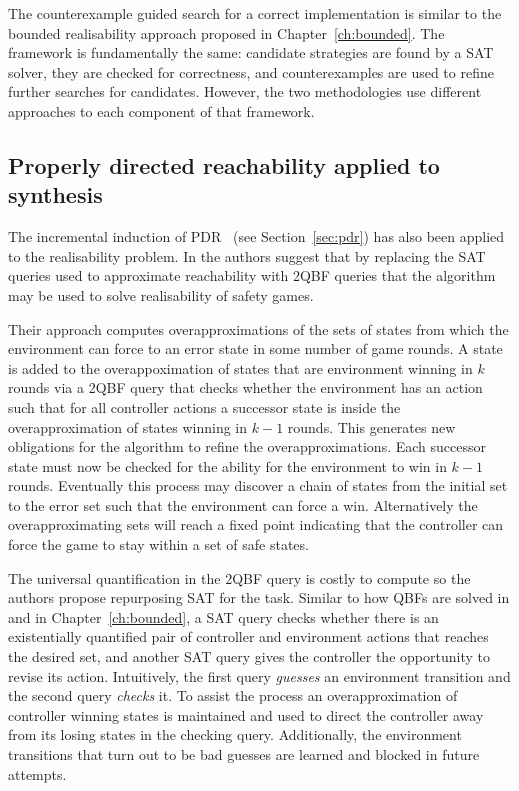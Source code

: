 The counterexample guided search for a correct implementation is similar to the bounded realisability approach proposed in Chapter~\ref{ch:bounded}. The framework is fundamentally the same: candidate strategies are found by a SAT solver, they are checked for correctness, and counterexamples are used to refine further searches for candidates. However, the two methodologies use different approaches to each component of that framework.

\subsection{Properly directed reachability applied to synthesis}

The incremental induction of PDR~\cite{Bradley11} (see Section~\ref{sec:pdr}) has also been applied to the realisability problem. In \cite{Morgenstern13} the authors suggest that by replacing the SAT queries used to approximate reachability with 2QBF queries that the algorithm may be used to solve realisability of safety games. 

Their approach computes overapproximations of the sets of states from which the environment can force to an error state in some number of game rounds. A state is added to the overappoximation of states that are environment winning in $k$ rounds via a 2QBF query that checks whether the environment has an action such that for all controller actions a successor state is inside the overapproximation of states winning in $k-1$ rounds. This generates new obligations for the algorithm to refine the overapproximations. Each successor state must now be checked for the ability for the environment to win in $k-1$ rounds. Eventually this process may discover a chain of states from the initial set to the error set such that the environment can force a win. Alternatively the overapproximating sets will reach a fixed point indicating that the controller can force the game to stay within a set of safe states.

The universal quantification in the 2QBF query is costly to compute so the authors propose repurposing SAT for the task. Similar to how QBFs are solved in \cite{Janota12} and in Chapter~\ref{ch:bounded}, a SAT query checks whether there is an existentially quantified pair of controller and environment actions that reaches the desired set, and another SAT query gives the controller the opportunity to revise its action. Intuitively, the first query \emph{guesses} an environment transition and the second query \emph{checks} it. To assist the process an overapproximation of controller winning states is maintained and used to direct the controller away from its losing states in the checking query. Additionally, the environment transitions that turn out to be bad guesses are learned and blocked in future attempts.

